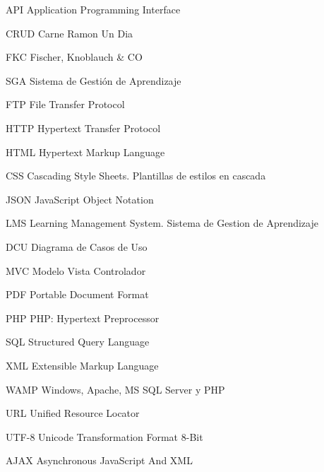 	{API}
	{Application Programming Interface}

	{CRUD}
	{Carne Ramon Un Dia}

	{FKC}
	{Fischer, Knoblauch \& CO}

	{SGA}
	{Sistema de Gestión de Aprendizaje}

	{FTP}
	{File Transfer Protocol}

	{HTTP}
	{Hypertext Transfer Protocol}

	{HTML}
	{Hypertext Markup Language}

	{CSS}
	{Cascading Style Sheets. Plantillas de estilos en cascada}

	{JSON}
	{JavaScript Object Notation}

	{LMS}
	{Learning Management System. Sistema de Gestion de Aprendizaje}

	{DCU}
	{Diagrama de Casos de Uso}

	{MVC}
	{Modelo Vista Controlador}

	{PDF}
	{Portable Document Format}

	{PHP}
	{PHP: Hypertext Preprocessor}

	{SQL}
	{Structured Query Language}

	{XML}
	{Extensible Markup Language}

	{WAMP}
	{Windows, Apache, MS SQL Server y PHP}

	{URL}
	{Unified Resource Locator}

	{UTF-8}
	{Unicode Transformation Format 8-Bit}

	{AJAX}
	{Asynchronous JavaScript And XML}

